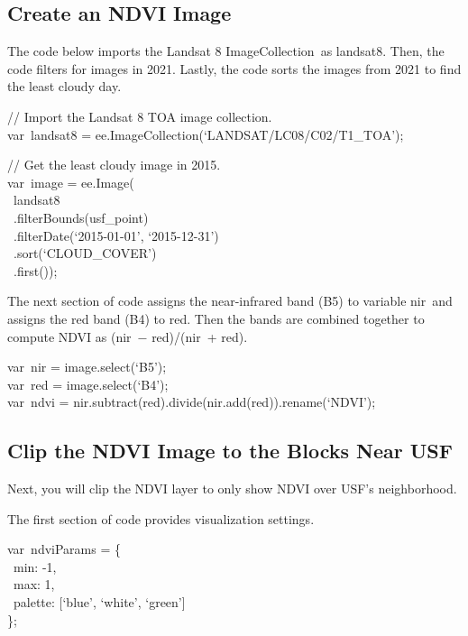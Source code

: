 \documentclass[
  letterpaper,
  DIV=11,
  numbers=noendperiod]{scrreprt}
\begin{document}
\hypertarget{create-an-ndvi-image}{%
\subsection{Create an NDVI Image}\label{create-an-ndvi-image}}

The code below imports the Landsat 8 ImageCollection~as landsat8. Then,
the code filters for images in 2021. Lastly, the code sorts the images
from 2021 to find the least cloudy day.

// Import the Landsat 8 TOA image collection.\\
var~landsat8 = ee.ImageCollection(`LANDSAT/LC08/C02/T1\_TOA');

// Get the least cloudy image in 2015.\\
var~image = ee.Image(\\
\hspace*{0.333em} ~landsat8\\
\hspace*{0.333em} ~.filterBounds(usf\_point)\\
\hspace*{0.333em} ~.filterDate(`2015-01-01', `2015-12-31')\\
\hspace*{0.333em} ~.sort(`CLOUD\_COVER')\\
\hspace*{0.333em} ~.first());

The next section of code assigns the near-infrared band (B5) to variable
nir~and assigns the red band (B4) to red. Then the bands are combined
together to compute NDVI as (nir~− red)/(nir~+ red).

var~nir = image.select(`B5');\\
var~red = image.select(`B4');\\
var~ndvi = nir.subtract(red).divide(nir.add(red)).rename(`NDVI');

\hypertarget{clip-the-ndvi-image-to-the-blocks-near-usf}{%
\subsection{Clip the NDVI Image to the Blocks Near
USF}\label{clip-the-ndvi-image-to-the-blocks-near-usf}}

Next, you will clip the NDVI layer to only show NDVI over USF's
neighborhood.

The first section of code provides visualization settings.

var~ndviParams = \{\\
\hspace*{0.333em} ~min: -1,\\
\hspace*{0.333em} ~max: 1,\\
\hspace*{0.333em} ~palette: {[}`blue', `white', `green'{]}\\
\};
\end{document}
